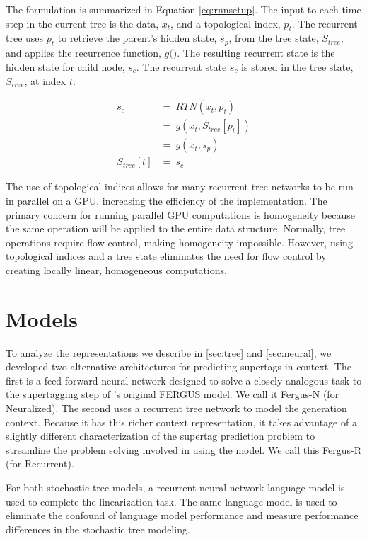 \documentclass[11pt]{article}
\begin{document}
The formulation is summarized in Equation \ref{eq:rnnsetup}.
%
The input to each time step in the current tree is the data, $x_t$, and a topological
index, $p_t$.
%
The recurrent tree uses $p_t$ to retrieve the parent's hidden state, $s_p$, from the
tree state, $S_{tree}$, and applies the recurrence function, $g(\dot)$.
%
The resulting recurrent state is the hidden state for child node, $s_c$.
%
The recurrent state $s_c$ is stored in the tree state, $S_{tree}$, at index $t$.

\begin{align}
       s_c~&=~RTN(x_t,p_t) \nonumber \\
           &=~g(x_t,S_{tree}[p_t]) \nonumber \\
           &=~g(x_t, s_p) \nonumber \\
S_{tree}[t]&=~s_c \label{eq:rnnsetup}
\end{align}

The use of topological indices allows for many recurrent tree networks to be
run in parallel on a GPU, increasing the efficiency of the implementation.
%
The primary concern for running parallel GPU computations is homogeneity because
the same operation will be applied to the entire data structure.
%
Normally, tree operations require flow control, making homogeneity impossible.
%
However, using topological indices and a tree state eliminates the need for flow control
by creating locally linear, homogeneous computations.

\section{Models}
\label{sec:models}

To analyze the representations we describe in \ref{sec:tree} and
\ref{sec:neural}, we developed two alternative architectures for
predicting supertags in context.
%
The first is a feed-forward neural network designed to solve a closely
analogous task to the supertagging step of
's original FERGUS model.
%
We call it Fergus-N (for Neuralized).
%
The second uses a recurrent tree network to model the generation
context.
%
Because it has this richer context representation, it takes advantage
of a slightly different characterization of the supertag prediction
problem to streamline the problem solving involved in using the model.
%
We call this Fergus-R (for Recurrent).

For both stochastic tree models, a recurrent neural network language model is used to complete the linearization task.
%
%
The same language model is used to eliminate the confound of
language model performance and measure performance differences in the
stochastic tree modeling.
%
\end{document}
